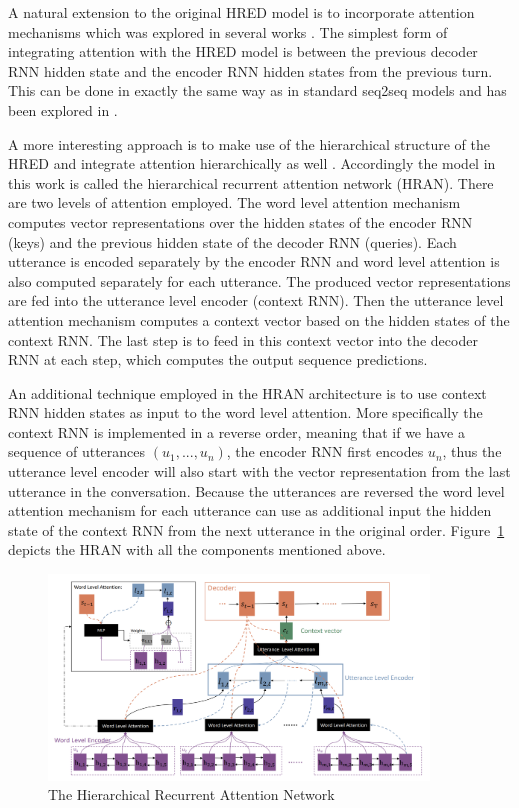 \documentclass[12pt]{article}
\begin{document}
A natural extension to the original HRED model is to incorporate attention mechanisms which was explored in several works \cite{Yao:2015,Yao:2016,Xing:2017}. The simplest form of integrating attention with the HRED model is between the previous decoder RNN hidden state and the encoder RNN hidden states from the previous turn. This can be done in exactly the same way as in standard seq2seq models and has been explored in \cite{Yao:2015,Yao:2016}.

A more interesting approach is to make use of the hierarchical structure of the HRED and integrate attention hierarchically as well \cite{Xing:2017}. Accordingly the model in this work is called the hierarchical recurrent attention network (HRAN). There are two levels of attention employed. The word level attention mechanism computes vector representations over the hidden states of the encoder RNN (keys) and the previous hidden state of the decoder RNN (queries). Each utterance is encoded separately by the encoder RNN and word level attention is also computed separately for each utterance. The produced vector representations are fed into the utterance level encoder (context RNN). Then the utterance level attention mechanism computes a context vector based on the hidden states of the context RNN. The last step is to feed in this context vector into the decoder RNN at each step, which computes the output sequence predictions. 

An additional technique employed in the HRAN architecture is to use context RNN hidden states as input to the word level attention. More specifically the context RNN is implemented in a reverse order, meaning that if we have a sequence of utterances \((u_1,...,u_n)\), the encoder RNN first encodes \(u_n\), thus the utterance level encoder will also start with the vector representation from the last utterance in the conversation. Because the utterances are reversed the word level attention mechanism for each utterance can use as additional input the hidden state of the context RNN from the next utterance in the original order. Figure~\ref{fig:HRAN} depicts the HRAN with all the components mentioned above.
\begin{figure}[H]
	\centering
	\includegraphics[width=0.9\textwidth]{pics/hran.png}
	\caption{The Hierarchical Recurrent Attention Network \cite{Xing:2017}}
	\label{fig:HRAN}
\end{figure}
\end{document}
